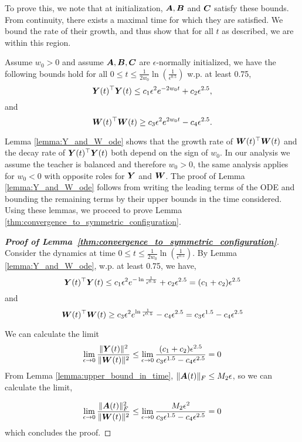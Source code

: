 To prove this, we note that at initialization, ${\bm{A}},{\bm{B}}$ and ${\bm{C}}$ satisfy these bounds. From continuity, there exists a maximal time for which they are satisfied. We bound the rate of their growth, and thus show that for all $t$ as described, we are within this region.

\begin{lemma}\label{lemma:Y_and_W_ode}
Assume $w_0>0$ and assume ${\bm{A}},{\bm{B}},{\bm{C}}$ are $\epsilon$-normally initialized, we have the following bounds hold for all $0\le t\le \frac{1}{2w_0}\ln{\left( \frac{1}{\epsilon^{0.5}}\right)}$ w.p. at least 0.75,
\begin{equation}\label{eq:z_ode}
    {\bm{Y}}(t)^\top {\bm{Y}}(t)  \le c_1\epsilon^2e^{-2w_0 t} + c_2 \epsilon^{2.5},
\end{equation}
and
\begin{equation}\label{eq:x_ode}
    {\bm{W}}(t)^\top {\bm{W}}(t)  \ge c_3\epsilon^2e^{2w_0 t} - c_4 \epsilon^{2.5}.
\end{equation}
\end{lemma}

Lemma \ref{lemma:Y_and_W_ode} shows that the growth rate of ${\bm{W}}(t)^\top {\bm{W}}(t)$ and the decay rate of ${\bm{Y}}(t)^\top {\bm{Y}}(t)$ both depend on the sign of $w_0$. In our analysis we assume the teacher is balanced and therefore $w_0>0$, the same analysis applies for $w_0<0$ with opposite roles for ${\bm{Y}}$ and ${\bm{W}}$. The proof of Lemma \ref{lemma:Y_and_W_ode} follows from writing the leading terms of the ODE and bounding the remaining terms by their upper bounds in the time considered.
Using these lemmas, we proceed to prove Lemma \ref{thm:convergence_to_symmetric_configuration}. 

\begin{proof}[\textbf{Proof of Lemma~\ref{thm:convergence_to_symmetric_configuration}}]
Consider the dynamics at time $0\le t\le \frac{1}{2w_0}\ln{\left( \frac{1}{\epsilon^{0.5}}\right)}$.
By Lemma \ref{lemma:Y_and_W_ode}, w.p. at least 0.75, we have,
\begin{equation}
    {\bm{Y}}(t)^\top {\bm{Y}}(t)\le c_1\epsilon^2 e^{-\ln{\frac{1}{\epsilon^{0.5}}}}+c_2 \epsilon^{2.5}=(c_1+c_2)\epsilon^{2.5}
\end{equation}
and
\begin{equation}
    {\bm{W}}(t)^\top {\bm{W}}(t)\ge c_3\epsilon^2 e^{\ln{\frac{1}{\epsilon^{0.5}}}}-c_4 \epsilon^{2.5}=c_3\epsilon^{1.5} - c_4\epsilon^{2.5}
\end{equation}

We can calculate the limit
\begin{align}
     \lim_{\epsilon\rightarrow 0} \frac{\|{\bm{Y}}(t)\|^2}{\|{\bm{W}}(t)\|^2}\le\lim_{\epsilon\rightarrow 0}\frac{(c_1+c_2)\epsilon^{2.5}}{c_3\epsilon^{1.5}-c_4\epsilon^{2.5}}=0
\end{align}
From Lemma \ref{lemma:upper_bound_in_time}, $\|{\bm{A}}(t)\|_F\le M_2\epsilon$, so we can calculate the limit,

\begin{equation}
    \lim_{\epsilon\rightarrow 0} \frac{\|{\bm{A}}(t)\|_F^2}{\|{\bm{W}}(t)\|^2} \le\lim_{\epsilon\rightarrow 0}\frac{M_2\epsilon^2}{c_3\epsilon^{1.5}-c_4\epsilon^{2.5}}=0
\end{equation}
which concludes the proof.
\end{proof}


